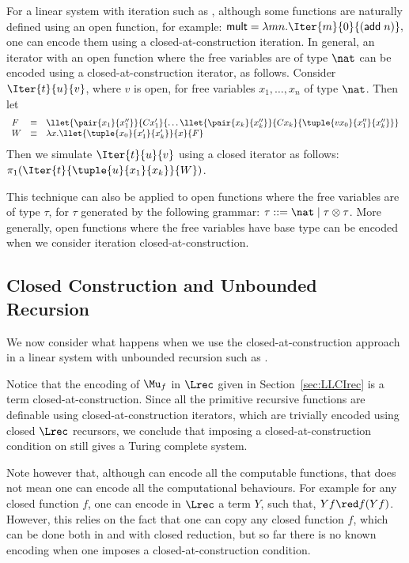 \documentclass{article}
\begin{document}
For a linear system with iteration such as \LLCI, although some
functions are naturally defined using an open function, for example:
$\mathsf{mult} = \lambda m n. \Iter{m}{0}{(\mathsf{add}\; n)},$ one
can encode them using a closed-at-construction iteration.  In general,
an iterator with an open function where the free variables are of type
$\nat$ can be encoded using a closed-at-construction iterator, as
follows.  Consider $\Iter{t}{u}{v}$, where $v$ is open, for free
variables $x_1,\dots,x_n$ of type $\nat$. Then let 
\[
\begin{array}{lcl}
F &\equiv&
\llet{\pair{x_1}{x_1''}}{C x_1'}{\dots \llet{\pair{x_k}{x_k''}}{C
    x_k}{\tuple{vx_0}{x_1''}{x_k''}}} \\
W & \equiv& \lambda
x. \llet{\tuple{x_0}{x_1'}{x_k'}}{x}{F}
\end{array}
\]
Then we simulate
$\Iter{t}{u}{v}$ using a closed iterator as follows:
$\pi_1(\Iter{t}{\tuple{u}{x_1}{x_k}}{W})$.

This technique can also be applied to open functions where the free
variables are of type $\tau$, for $\tau$ generated by the following
grammar: $\tau ::= \nat \mid \tau \otimes \tau$.  More generally, open
functions where the free variables have base type can be encoded when
we consider iteration closed-at-construction.


\subsection{Closed Construction and Unbounded Recursion}

We now consider what happens when we use the closed-at-construction
approach in a linear system with unbounded recursion such as \LLCIrec.

Notice that the encoding of $\Mu_f$ in $\Lrec$ given in Section~\ref{sec:LLCIrec}
is a term
closed-at-construction.  Since all the primitive recursive functions
are definable using closed-at-construction iterators, which are
trivially encoded using closed $\Lrec$ recursors, we conclude that
imposing a closed-at-construction condition on \LLCIrec still gives a
Turing complete system.

Note however that, although \LLCIrec can encode all the computable
functions, that does not mean one can encode all the computational
behaviours. For example for any closed function $f$, one can encode in
$\Lrec$ a term $Y$, such that, $Yf \red f(Yf)$. However, this relies
on the fact that one can copy any closed function $f$, which can be
done both in \LLCI and \LLCIrec with closed reduction, but so far
there is no known encoding when one imposes a closed-at-construction
condition.
\end{document}
